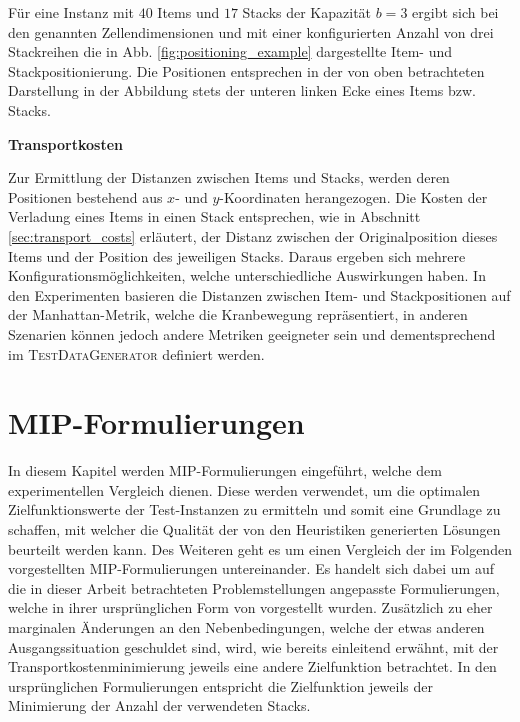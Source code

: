 Für eine Instanz mit $40$ Items und $17$ Stacks der Kapazität $b = 3$ ergibt sich bei den genannten
Zellendimensionen und mit einer konfigurierten Anzahl von drei Stackreihen die in Abb. \ref{fig:positioning_example} dargestellte Item- und Stackpositionierung. Die Positionen entsprechen in der von oben betrachteten Darstellung
in der Abbildung stets der unteren linken Ecke eines Items bzw. Stacks.

\vfill
\pagebreak


\textbf{Transportkosten}

Zur Ermittlung der Distanzen zwischen Items und Stacks, werden deren Positionen bestehend aus $x$- und $y$-Koordinaten
herangezogen. Die Kosten der Verladung eines Items in einen Stack entsprechen, wie in Abschnitt
\ref{sec:transport_costs} erläutert, der Distanz zwischen der Originalposition dieses Items und der Position
des jeweiligen Stacks. Daraus ergeben sich mehrere Konfigurationsmöglichkeiten, welche unterschiedliche Auswirkungen haben.
In den Experimenten basieren die Distanzen zwischen Item- und Stackpositionen auf der Manhattan-Metrik,
welche die Kranbewegung repräsentiert, in anderen Szenarien können jedoch andere Metriken geeigneter sein
und dementsprechend im \textsc{TestDataGenerator} definiert werden.

\vfill

\pagebreak

\section{MIP-Formulierungen}
\label{sec:mip_formulations}

In diesem Kapitel werden MIP-Formulierungen eingeführt, welche dem experimentellen Vergleich dienen.
Diese werden verwendet, um die optimalen Zielfunktionswerte der Test-Instanzen zu ermitteln und somit eine Grundlage zu schaffen, mit welcher die Qualität der von den Heuristiken generierten Lösungen beurteilt werden kann. Des Weiteren geht es um einen Vergleich der im Folgenden vorgestellten MIP-Formulierungen untereinander.
Es handelt sich dabei um auf die in dieser Arbeit betrachteten Problemstellungen angepasste Formulierungen,
welche in ihrer ursprünglichen Form von \citet{Le2016} vorgestellt wurden.
Zusätzlich zu eher marginalen Änderungen an den Nebenbedingungen, welche der etwas anderen Ausgangssituation geschuldet sind,
wird, wie bereits einleitend erwähnt, mit der Transportkostenminimierung jeweils eine andere Zielfunktion betrachtet.
In den ursprünglichen Formulierungen entspricht die Zielfunktion jeweils der Minimierung der Anzahl der verwendeten Stacks.

